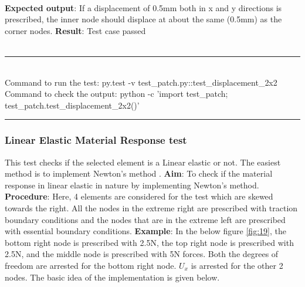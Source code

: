 \documentclass[fleqn, 12.5pt,a4paper]{report}
\begin{document}
\\
\textbf{Expected output}: If a displacement of 0.5mm both in x and y directions is prescribed, the inner node should displace at about the same (0.5mm) as the corner nodes. \newline
\textbf{Result}: Test case passed\\
\\
{\rule{\linewidth}{0.02cm}}\\
Command to run the test: {\selectfont py.test -v test{\_}patch.py::test{\_}displacement{\_}2x2}\\
Command to check the output: {\selectfont python -c 'import test{\_}patch;\\
test{\_}patch.test{\_}displacement{\_}2x2()'}\\
{\rule{\linewidth}{0.02cm}}

\subsubsection{Linear Elastic Material Response test}
This test checks if the selected element is a Linear elastic or not. The easiest method is to implement Newton's method \cite{taylor2014feap}.\newline
\textbf{Aim}: To check if the material response in linear elastic in nature by implementing Newton's method.\newline
\textbf{Procedure}: Here, 4 elements are considered for the test which are skewed towards the right. All the nodes in the extreme right are prescribed with traction boundary conditions and the nodes that are in the extreme left are prescribed with essential boundary conditions.\newline
\textbf{Example}: In the below figure \autoref{fig:19}, the bottom right node is prescribed with 2.5N, the top right node is prescribed with 2.5N, and the middle node is prescribed with 5N forces. Both the degrees of freedom are arrested for the  bottom right node. $U_x$ is arrested for the other 2 nodes. The basic idea of  the implementation is given below. 
\end{document}
